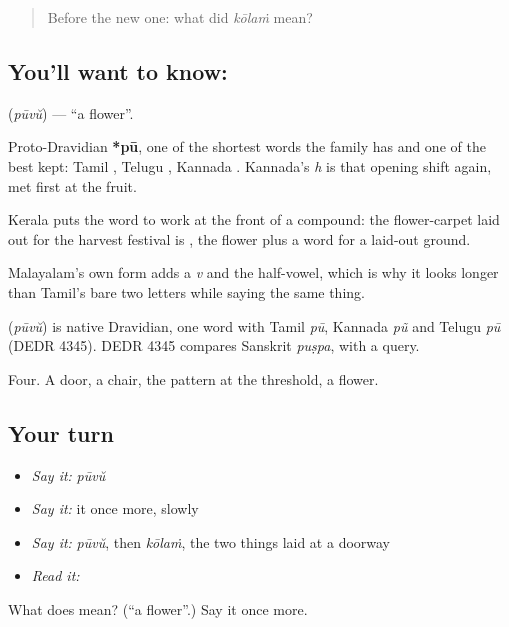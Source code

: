 \begin{quote}
Before the new one: what did \emph{kōlaṁ} mean?
\end{quote}

\subsection*{You'll want to know: }
\textbf{} (\emph{pūvŭ}) — \textquotedblleft{}a flower\textquotedblright{}.

Proto-Dravidian \textbf{*pū}, one of the shortest words the family has and one of the best kept: Tamil , Telugu , Kannada . Kannada's \emph{h} is that opening shift again, met first at the fruit.

Kerala puts the word to work at the front of a compound: the flower-carpet laid out for the harvest festival is , the flower plus a word for a laid-out ground.

Malayalam's own form adds a \emph{v} and the half-vowel, which is why it looks longer than Tamil's bare two letters while saying the same thing.

\begin{cousinweb}
\textbf{} (\emph{pūvŭ}) is native Dravidian, one word with Tamil \emph{pū}, Kannada \emph{pũ} and Telugu \emph{pū} (DEDR 4345). DEDR 4345 compares Sanskrit \emph{puṣpa}, with a query.
\end{cousinweb}

\begin{grammarlens}[title={What you've built}]
Four. A door, a chair, the pattern at the threshold, a flower.
\end{grammarlens}

\subsection*{Your turn}
\begin{itemize}
\raggedright
  \item \emph{Say it:} \emph{pūvŭ}
  \item \emph{Say it:} it once more, slowly
  \item \emph{Say it:} \emph{pūvŭ}, then \emph{kōlaṁ}, the two things laid at a doorway
  \item \emph{Read it:} \textbf{}
\end{itemize}

\begin{tcolorbox}[breakable,colback=teal!4,colframe=teal!35!black,title={Before you move on}]
What does  mean? (\textquotedblleft{}a flower\textquotedblright{}.) Say it once more.
\end{tcolorbox}
